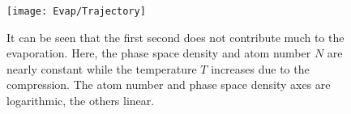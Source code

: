 \clearpage
%
%
\begin{figure}[bp]
    \centering
    \texttt{[image: Evap/Trajectory]}
    \caption[Evaporation trajectory for case 5]{It can be seen that the first second does not contribute much to the evaporation. Here, the phase space density \PSD and atom number $N$ are nearly constant while the temperature $T$ increases due to the compression. The atom number and phase space density axes are logarithmic, the others linear.}
    \label{fig:evap_trajectory}
\end{figure}

